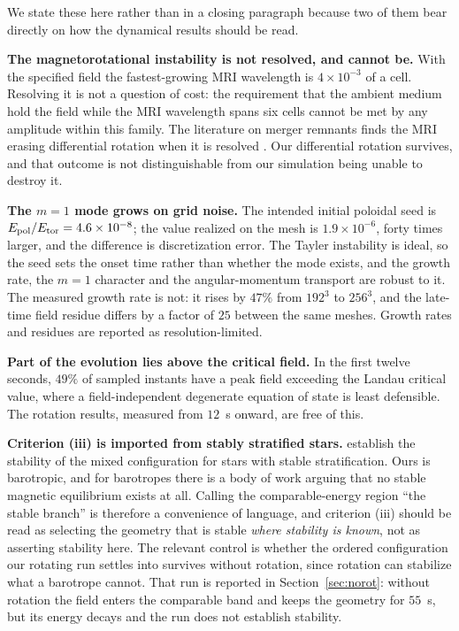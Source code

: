 \documentclass[twocolumn,linenumbers]{aastex701}
\newcommand{\Etor}{E_{\rm tor}}
\newcommand{\Epol}{E_{\rm pol}}
\begin{document}
We state these here rather than in a closing paragraph because two of them
bear directly on how the dynamical results should be read.

\textbf{The magnetorotational instability is not resolved, and cannot be.}
With the specified field the fastest-growing MRI wavelength is
$4\times10^{-3}$ of a cell. Resolving it is not a question of cost: the
requirement that the ambient medium hold the field while the MRI wavelength
spans six cells cannot be met by any amplitude within this family. The
literature on merger remnants finds the MRI erasing differential rotation when
it is resolved \citep{pakmor2024}. Our differential rotation survives, and
that outcome is not distinguishable from our simulation being unable to
destroy it.

\textbf{The $m=1$ mode grows on grid noise.} The intended initial poloidal
seed is $\Epol/\Etor = 4.6\times10^{-8}$; the value realized on the mesh is
$1.9\times10^{-6}$, forty times larger, and the difference is discretization
error. The Tayler instability is ideal, so the seed sets the onset time rather
than whether the mode exists, and the growth rate, the $m=1$ character and the
angular-momentum transport are robust to it. The measured growth rate is not:
it rises by $47\%$ from $192^3$ to $256^3$, and the late-time field residue
differs by a factor of $25$ between the same meshes. Growth rates and residues
are reported as resolution-limited.

\textbf{Part of the evolution lies above the critical field.} In the first
twelve seconds, $49\%$ of sampled instants have a peak field exceeding the
Landau critical value, where a field-independent degenerate equation of state
is least defensible. The rotation results, measured from $12$~s onward, are
free of this.

\textbf{Criterion (iii) is imported from stably stratified stars.}
\citet{braithwaite2006} establish the stability of the mixed configuration for
stars with stable stratification. Ours is barotropic, and for barotropes there
is a body of work arguing that no stable magnetic equilibrium exists at all.
Calling the comparable-energy region ``the stable branch'' is therefore a
convenience of language, and criterion (iii) should be read as selecting the
geometry that is stable \emph{where stability is known}, not as asserting
stability here. The relevant control is whether the ordered configuration our
rotating run settles into survives without rotation, since rotation can
stabilize what a barotrope cannot. That run is reported in
Section~\ref{sec:norot}: without rotation the field enters the comparable
band and keeps the geometry for $55$~s, but its energy decays and the run does
not establish stability.
\end{document}

